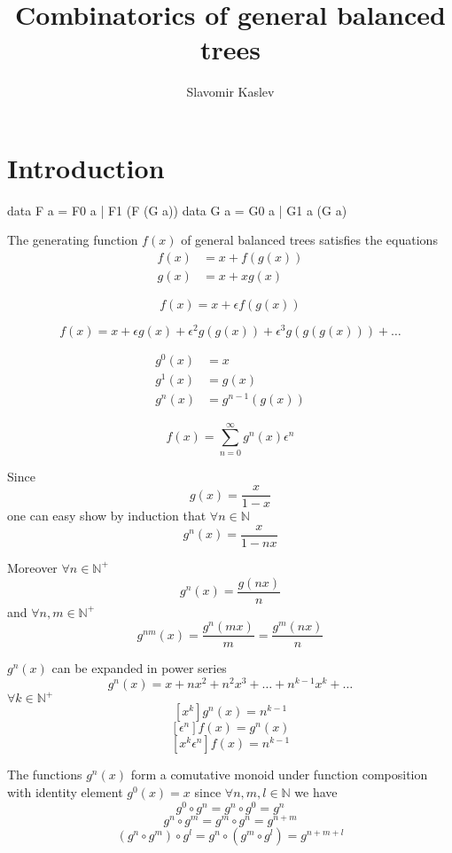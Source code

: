\documentclass[a4paper]{article}
\title{Combinatorics of general balanced trees}
\author{Slavomir Kaslev}
\begin{document}
\maketitle

\section{Introduction}

\begin{code}
  data F a = F0 a | F1 (F (G a))
  data G a = G0 a | G1 a (G a)
\end{code}

The generating function $f(x)$ of general balanced trees satisfies the equations
\begin{align*}
  f(x) &= x + f(g(x)) \\
  g(x) &= x + x g(x)
\end{align*}

\begin{equation}
  f(x) = x + \epsilon f(g(x))\label{eq:eq1}
\end{equation}

$$f(x) = x + \epsilon g(x) + \epsilon^2 g(g(x)) + \epsilon^3 g(g(g(x))) + \dots$$

\begin{align*}
g^0(x) &= x\\
g^1(x) &= g(x)\\
g^n(x) &= g^{n-1}(g(x))
\end{align*}

\begin{equation}
f(x) = \sum_{n=0}^{\infty}{g^n(x)} \epsilon^n
\end{equation}


Since
\begin{equation}
  g(x) = \frac{x}{1-x}
\end{equation}
one can easy show by induction that $\forall n \in \mathbb{N}$
$$g^n(x) = \frac{x}{1 - n x}$$

Moreover $\forall n \in \mathbb{N}^+$
$$g^n(x) = \frac{g(n x)}{n} $$
and $\forall n,m \in \mathbb{N}^{+}$
$$g^{nm}(x) = \frac{g^n(m x)}{m} = \frac{g^m(n x)}{n}$$

$g^n(x)$ can be expanded in power series
$$g^n(x) = x + n x^2 + n^2 x^3 + \dots + n^{k-1}x^k + \dots$$
$\forall k \in \mathbb{N}^{+}$
$$[x^k] g^n(x) = n^{k-1}$$
$$[\epsilon^n] f(x) = g^n(x)$$
$$[x^k\epsilon^n] f(x) = n^{k-1}$$

The functions $g^n(x)$ form a comutative monoid under function composition
with identity element $g^0(x) = x$ since $\forall n, m, l\in \mathbb{N}$ we have
$$g^0 \circ g^n = g^n \circ g^0 = g^n$$
$$g^n \circ g^m = g^m \circ g^n = g^{n+m}$$
$$(g^n \circ g^m) \circ g^l = g^n \circ (g^m \circ g^l) = g^{n+m+l}$$
\end{document}
